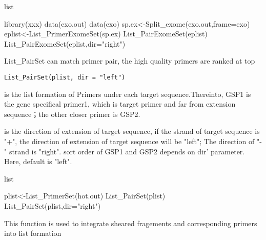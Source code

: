 \documentclass[a4paper]{book}
\begin{document}
%
\begin{Value}
list
\end{Value}
%
\begin{Examples}
\begin{ExampleCode}
library(xxx)
data(exo.out)
data(exo)
sp.ex<-Split_exome(exo.out,frame=exo)
eplist<-List_PrimerExomeSet(sp.ex)
List_PairExomeSet(eplist)
List_PairExomeSet(eplist,dir="right")
\end{ExampleCode}
\end{Examples}
%
\begin{Description}\relax
List\_PairSet can match primer pair, the high quality primers are ranked at top
\end{Description}
%
\begin{Usage}
\begin{verbatim}
List_PairSet(plist, dir = "left")
\end{verbatim}
\end{Usage}
%
\begin{Arguments}
\begin{ldescription}
\item[\code{plist}] is the list formation of  Primers under each target sequence.Thereinto,
GSP1 is the gene specifical primer1, which is target primer and far from extension
sequence；the other closer primer is GSP2.

\item[\code{dir}] is the direction of extension of target sequence, if the strand of target sequence
is "+", the direction of extension of target sequence will be "left"; The direction of
"-" strand is "right". sort order of GSP1 and GSP2 depends on dir' parameter. Here, default is "left".
\end{ldescription}
\end{Arguments}
%
\begin{Value}
list
\end{Value}
%
\begin{Examples}
\begin{ExampleCode}
plist<-List_PrimerSet(hot.out)
List_PairSet(plist)
List_PairSet(plist,dir="right")
\end{ExampleCode}
\end{Examples}
%
\begin{Description}\relax
This function is used to integrate sheared fragements and corresponding primers into list formation
\end{Description}
\end{document}
